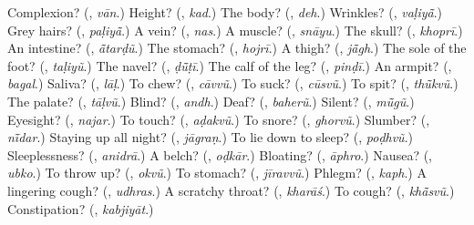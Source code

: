 \begin{tcolorbox}[breakable,colback=teal!4,colframe=teal!35!black,title={Before you move on}]
Complexion? (\textbf{}, \emph{vān}.) Height? (\textbf{}, \emph{kad}.) The body? (\textbf{}, \emph{deh}.) Wrinkles? (\textbf{}, \emph{vaḷiyā̃}.) Grey hairs? (\textbf{}, \emph{paḷiyā̃}.) A vein? (\textbf{}, \emph{nas}.) A muscle? (\textbf{}, \emph{snāyu}.) The skull? (\textbf{}, \emph{khoprī}.) An intestine? (\textbf{}, \emph{ā̃tarḍũ}.) The stomach? (\textbf{}, \emph{hojrī}.) A thigh? (\textbf{}, \emph{jā̃gh}.) The sole of the foot? (\textbf{}, \emph{taḷiyũ}.) The navel? (\textbf{}, \emph{ḍū̃ṭī}.) The calf of the leg? (\textbf{}, \emph{pinḍī}.) An armpit? (\textbf{}, \emph{bagal}.) Saliva? (\textbf{}, \emph{lāḷ}.) To chew? (\textbf{}, \emph{cāvvũ}.) To suck? (\textbf{}, \emph{cūsvũ}.) To spit? (\textbf{}, \emph{thū̃kvũ}.) The palate? (\textbf{}, \emph{tāḷvũ}.) Blind? (\textbf{}, \emph{andh}.) Deaf? (\textbf{}, \emph{baherũ}.) Silent? (\textbf{}, \emph{mū̃gũ}.) Eyesight? (\textbf{}, \emph{najar}.) To touch? (\textbf{}, \emph{aḍakvũ}.) To snore? (\textbf{}, \emph{ghorvũ}.) Slumber? (\textbf{}, \emph{nī̃dar}.) Staying up all night? (\textbf{}, \emph{jāgraṇ}.) To lie down to sleep? (\textbf{}, \emph{poḍhvũ}.) Sleeplessness? (\textbf{}, \emph{anidrā}.) A belch? (\textbf{}, \emph{oḍkār}.) Bloating? (\textbf{}, \emph{āphro}.) Nausea? (\textbf{}, \emph{ubko}.) To throw up? (\textbf{}, \emph{okvũ}.) To stomach? (\textbf{}, \emph{jīravvũ}.) Phlegm? (\textbf{}, \emph{kaph}.) A lingering cough? (\textbf{}, \emph{udhras}.) A scratchy throat? (\textbf{}, \emph{kharāś}.) To cough? (\textbf{}, \emph{khā̃svũ}.) Constipation? (\textbf{}, \emph{kabjiyāt}.)
\end{tcolorbox}
